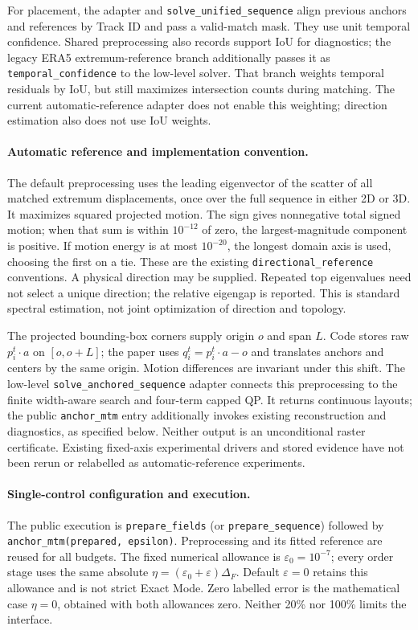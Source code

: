 \documentclass[10pt]{article}
\begin{document}
For placement, the adapter and \texttt{solve\_unified\_sequence} align previous anchors and references by Track ID and pass a valid-match mask. They use unit temporal confidence. Shared preprocessing also records support IoU for diagnostics; the legacy ERA5 extremum-reference branch additionally passes it as \texttt{temporal\_confidence} to the low-level solver. That branch weights temporal residuals by IoU, but still maximizes intersection counts during matching. The current automatic-reference adapter does not enable this weighting; direction estimation also does not use IoU weights.

\paragraph{Automatic reference and implementation convention.}
The default preprocessing uses the leading eigenvector of the scatter of all matched extremum displacements, once over the full sequence in either 2D or 3D. It maximizes squared projected motion. The sign gives nonnegative total signed motion; when that sum is within $10^{-12}$ of zero, the largest-magnitude component is positive. If motion energy is at most $10^{-20}$, the longest domain axis is used, choosing the first on a tie. These are the existing \texttt{directional\_reference} conventions. A physical direction may be supplied. Repeated top eigenvalues need not select a unique direction; the relative eigengap is reported. This is standard spectral estimation, not joint optimization of direction and topology.

The projected bounding-box corners supply origin $o$ and span $L$. Code stores raw $p_i^t\cdot a$ on $[o,o+L]$; the paper uses $q_i^t=p_i^t\cdot a-o$ and translates anchors and centers by the same origin. Motion differences are invariant under this shift. The low-level \texttt{solve\_anchored\_sequence} adapter connects this preprocessing to the finite width-aware search and four-term capped QP. It returns continuous layouts; the public \texttt{anchor\_mtm} entry additionally invokes existing reconstruction and diagnostics, as specified below. Neither output is an unconditional raster certificate. Existing fixed-axis experimental drivers and stored evidence have not been rerun or relabelled as automatic-reference experiments.

\paragraph{Single-control configuration and execution.}
The public execution is \texttt{prepare\_fields} (or \texttt{prepare\_sequence}) followed by \texttt{anchor\_mtm(prepared, epsilon)}. Preprocessing and its fitted reference are reused for all budgets. The fixed numerical allowance is $\varepsilon_0=10^{-7}$; every order stage uses the same absolute $\eta=(\varepsilon_0+\varepsilon)\Delta_F$. Default $\varepsilon=0$ retains this allowance and is not strict Exact Mode. Zero labelled error is the mathematical case $\eta=0$, obtained with both allowances zero. Neither 20\% nor 100\% limits the interface.
\end{document}
